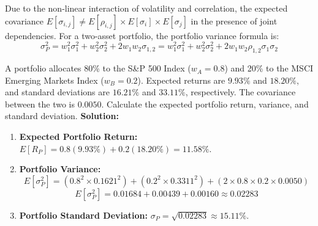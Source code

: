 Due to the non-linear interaction of volatility and correlation, the expected covariance $E[\sigma_{i,j}] \neq E[\rho_{i,j}] \times E[\sigma_i] \times E[\sigma_j]$ in the presence of joint dependencies.
For a two-asset portfolio, the portfolio variance formula is:
\begin{equation}
	\sigma_P^2 = w_1^2 \sigma_1^2 + w_2^2 \sigma_2^2 + 2 w_1 w_2 \sigma_{1,2} = w_1^2 \sigma_1^2 + w_2^2 \sigma_2^2 + 2 w_1 w_2 \rho_{1,2} \sigma_1 \sigma_2
	\label{eq:two_asset_variance_m8}
\end{equation}
\begin{tcolorbox}[
	colback=gray!5!white,
	colframe=black!15!white,
	boxrule=0.5pt,
	arc=3pt,
	title=\textbf{Example 2: Portfolio Allocation (Two-Asset)},
	coltitle=black,
	colbacktitle=black!5!white,
	before skip=6pt,
	after skip=6pt,
	breakable
]
A portfolio allocates 80\% to the S\&P 500 Index ($w_A = 0.8$) and 20\% to the MSCI Emerging Markets Index ($w_B = 0.2$). Expected returns are $9.93\%$ and $18.20\%$, and standard deviations are $16.21\%$ and $33.11\%$, respectively. The covariance between the two is $0.0050$.
Calculate the expected portfolio return, variance, and standard deviation.
\textbf{Solution:}
\begin{enumerate}
	\item \textbf{Expected Portfolio Return:} $E[R_P] = 0.8(9.93\%) + 0.2(18.20\%) = 11.58\%$.
	\item \textbf{Portfolio Variance:}
	      \[
	      E[\sigma_P^2] = (0.8^2 \times 0.1621^2) + (0.2^2 \times 0.3311^2) + (2 \times 0.8 \times 0.2 \times 0.0050)
	      \]
	      \[
	      E[\sigma_P^2] = 0.01684 + 0.00439 + 0.00160 \approx 0.02283
	      \]
	\item \textbf{Portfolio Standard Deviation:} $\sigma_P = \sqrt{0.02283} \approx 15.11\%$.
\end{enumerate}
\end{tcolorbox}
